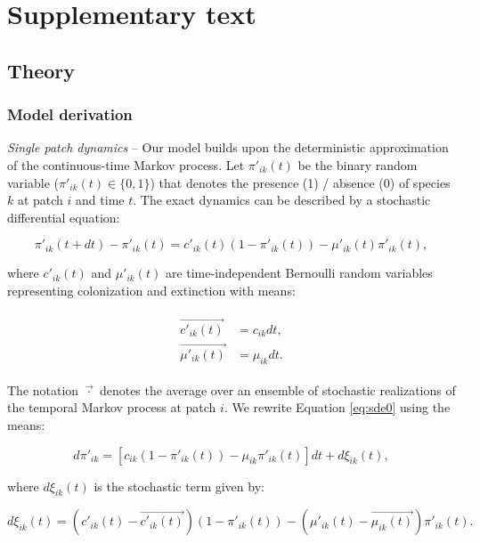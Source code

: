 \documentclass[11pt, class=article, crop=false]{standalone}
\begin{document}
\section{Supplementary text}

\subsection{Theory}

\subsubsection{Model derivation}

\textit{Single patch dynamics} --
Our model builds upon the deterministic approximation of the continuous-time Markov process.
Let $\pi'_{ik}(t)$ be the binary random variable ($\pi'_{ik}(t) \in \{0, 1\}$) that denotes the presence (1) / absence (0) of species $k$ at patch $i$ and time $t$.
The exact dynamics can be described by a stochastic differential equation:

\begin{equation}
    \pi'_{ik}(t + dt) - \pi'_{ik}(t) = c'_{ik}(t) (1 - \pi'_{ik}(t)) - \mu'_{ik}(t) \pi'_{ik}(t),
    \label{eq:sde0}
\end{equation}

where $c'_{ik}(t)$ and $\mu'_{ik}(t)$ are time-independent Bernoulli random variables representing colonization and extinction with means:

\begin{align}
    \begin{split}
        \overrightarrow{c'_{ik}(t)} &= c_{ik} dt,\\
        \overrightarrow{\mu'_{ik}(t)} &= \mu_{ik} dt.
    \end{split}
\end{align}

The notation $\overrightarrow{\cdot}$ denotes the average over an ensemble of stochastic realizations of the temporal Markov process at patch $i$.
We rewrite Equation \ref{eq:sde0} using the means:

\begin{equation}
    d \pi'_{ik} = [c_{ik} (1 - \pi'_{ik}(t)) - \mu_{ik} \pi'_{ik}(t)]dt + d\xi_{ik}(t),
    \label{eq:sde1}
\end{equation}

where $d\xi_{ik}(t)$ is the stochastic term given by:

\begin{equation}
    d\xi_{ik}(t) = (c'_{ik}(t) - \overrightarrow{c'_{ik}(t)}) (1 - \pi'_{ik}(t)) - (\mu'_{ik}(t) - \overrightarrow{\mu_{ik}(t)}) \pi'_{ik}(t).
\end{equation}
\end{document}
